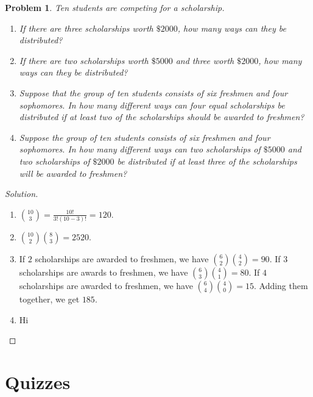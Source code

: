 \documentclass[oneside]{book}
\theoremstyle{mystyle}
\newtheorem{problem}{Problem}[section]
\begin{document}
\begin{problem}
Ten students are competing for a scholarship.
\begin{enumerate}
    \item If there are three scholarships worth $\$2000$, how many ways can they be distributed?
    \item If there are two scholarships worth $\$5000$ and three worth $\$2000$, how many ways can they be distributed?
    \item Suppose that the group of ten students consists of six freshmen and four sophomores. In how many different ways can four equal scholarships be distributed if at least two of the scholarships should be awarded to freshmen?
    \item Suppose the group of ten students consists of six freshmen and four sophomores. In how many different ways can two scholarships of $\$5000$ and two scholarships of $\$2000$ be distributed if at least three of the scholarships will be awarded to freshmen?
\end{enumerate}
\end{problem}
\begin{proof}[Solution]
\
\begin{enumerate}
    \item $\binom{10}{3} = \frac{10!}{3!(10-3)!} = 120$.
    \item $\binom{10}{2}\binom{8}{3} = 2520$.
    \item If $2$ scholarships are awarded to freshmen, we have $\binom{6}{2}\binom{4}{2} = 90$. If $3$ scholarships are awards to freshmen, we have $\binom{6}{3}\binom{4}{1} = 80$. If $4$ scholarships are awarded to freshmen, we have $\binom{6}{4}\binom{4}{0} = 15$. Adding them together, we get $185$.
    \item Hi
\end{enumerate}
\end{proof}
\section{Quizzes}
\end{document}
